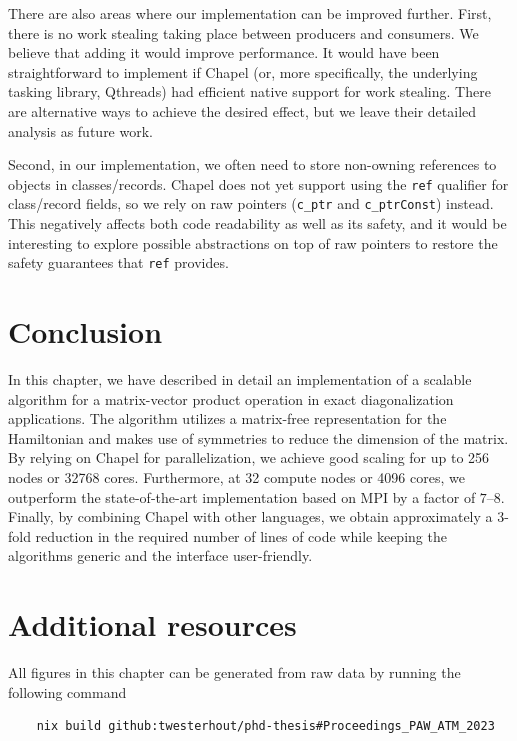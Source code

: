 There are also areas where our implementation can be improved further. First, there is no work stealing taking place between producers and consumers. We believe that adding it would improve performance. It would have been straightforward to implement if Chapel (or, more specifically, the underlying tasking library, Qthreads) had efficient native support for work stealing. There are alternative ways to achieve the desired effect, but we leave their detailed analysis as future work.

Second, in our implementation, we often need to store non-owning references to objects in classes/records. Chapel does not yet support using the \verb|ref| qualifier for class/record fields, so we rely on raw pointers (\verb|c_ptr| and \verb|c_ptrConst|) instead. This negatively affects both code readability as well as its safety, and it would be interesting to explore possible abstractions on top of raw pointers to restore the safety guarantees that \verb|ref| provides.

\section{Conclusion}\label{sec:ls23:conclusion}

In this chapter, we have described in detail an implementation of a scalable algorithm for a matrix-vector product operation in exact diagonalization applications. The algorithm utilizes a matrix-free representation for the Hamiltonian and makes use of symmetries to reduce the dimension of the matrix. By relying on Chapel for parallelization, we achieve good scaling for up to 256 nodes or 32768 cores. Furthermore, at 32 compute nodes or 4096 cores, we outperform the state-of-the-art implementation based on MPI by a factor of $7$--$8$. Finally, by combining Chapel with other languages, we obtain approximately a 3-fold reduction in the required number of lines of code while keeping the algorithms generic and the interface user-friendly.

\section{Additional resources}


\noindent All figures in this chapter can be generated from raw data by running the following command
\begin{verbatim}
    nix build github:twesterhout/phd-thesis#Proceedings_PAW_ATM_2023
\end{verbatim}

